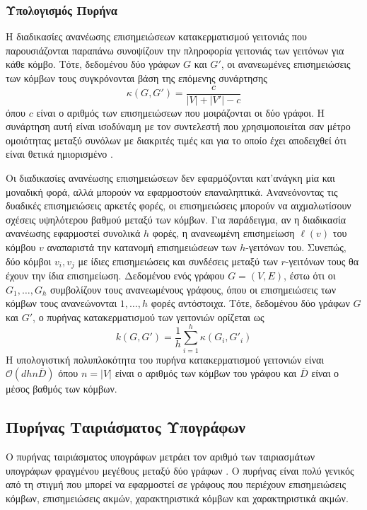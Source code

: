 \subsubsection{Υπολογισμός Πυρήνα}
Η διαδικασίες ανανέωσης επισημειώσεων κατακερματισμού γειτονιάς που παρουσιάζονται παραπάνω συνοψίζουν την πληροφορία γειτονιάς των γειτόνων για κάθε κόμβο.
Τότε, δεδομένου δύο γράφων $G$ και $G'$, οι ανανεωμένες επισημειώσεις των κόμβων τους συγκρόνονται βάση της επόμενης συνάρτησης
\begin{equation}
    \kappa(G, G') = \frac{c}{|V| + |V'| - c}
\end{equation}
όπου $c$ είναι ο αριθμός των επισημειώσεων που μοιράζονται οι δύο γράφοι.
Η συνάρτηση αυτή είναι ισοδύναμη με τον συντελεστή \textit{} που χρησιμοποιείται σαν μέτρο ομοιότητας μεταξύ συνόλων με διακριτές τιμές και για το οποίο έχει αποδειχθεί ότι είναι θετικά ημιορισμένο \cite{gower1971general}.

Οι διαδικασίες ανανέωσης επισημειώσεων δεν εφαρμόζονται κατ'ανάγκη μία και μοναδική φορά, αλλά μπορούν να εφαρμοστούν επαναληπτικά.
Ανανεόνοντας τις δυαδικές επισημειώσεις αρκετές φορές, οι επισημειώσεις μπορούν να αιχμαλωτίσουν σχέσεις υψηλότερου βαθμού μεταξύ των κόμβων.
Για παράδειγμα, αν η διαδικασία ανανέωσης εφαρμοστεί συνολικά $h$ φορές, η ανανεωμένη επισημείωση $\ell(v)$ του κόμβου $v$ αναπαριστά την κατανομή επισημειώσεων των $h$-γειτόνων του.
Συνεπώς, δύο κόμβοι $v_i, v_j$ με ίδιες επισημειώσεις και συνδέσεις μεταξύ των $r$-γειτόνων τους θα έχουν την ίδια επισημείωση.
Δεδομένου ενός γράφου $G=(V,E)$, έστω ότι οι $G_1, \ldots, G_h$ συμβολίζουν τους ανανεωμένους γράφους, όπου οι επισημειώσεις των κόμβων τους ανανεώνονται $1,\ldots,h$ φορές αντόστοιχα.
Τότε, δεδομένου δύο γράφων $G$ και $G'$, ο πυρήνας κατακερματισμού των γειτονιών ορίζεται ως
\begin{equation}
    k(G, G') = \frac{1}{h} \sum_{i=1}^h \kappa(G_i, G'_i)
\end{equation}
Η υπολογιστική πολυπλοκότητα του πυρήνα κατακερματισμού γειτονιών είναι $\mathcal{O}(dhn\bar{D})$ όπου $n=|V|$ είναι ο αριθμός των κόμβων του γράφου και $\bar{D}$ είναι ο μέσος βαθμός των κόμβων.

\subsection{Πυρήνας Ταιριάσματος Υπογράφων}
Ο πυρήνας ταιριάσματος υπογράφων μετράει τον αριθμό των ταιριασμάτων υπογράφων φραγμένου μεγέθους μεταξύ δύο γράφων \cite{Kriege2012SubgraphMK}.
Ο πυρήνας είναι πολύ γενικός από τη στιγμή που μπορεί να εφαρμοστεί σε γράφους που περιέχουν επισημειώσεις κόμβων, επισημειώσεις ακμών, χαρακτηριστικά κόμβων και χαρακτηριστικά ακμών.

